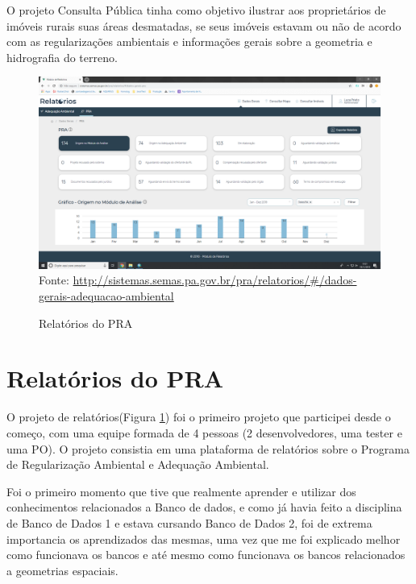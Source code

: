 O projeto Consulta Pública tinha como objetivo ilustrar aos proprietários de imóveis rurais suas áreas desmatadas, se seus imóveis estavam ou não de acordo com as regularizações ambientais e informações gerais sobre a geometria e hidrografia do terreno.

\begin{figure}[H]
\centering
\caption{Relatórios do PRA} %
\includegraphics[scale=0.22]{relatorios-pra}\\  %
{\small Fonte: \url{http://sistemas.semas.pa.gov.br/pra/relatorios/#/dados-gerais-adequacao-ambiental}} %
\label{fig:relatorios} %
\end{figure}

\section{Relatórios do PRA}
O projeto de relatórios(Figura \ref{fig:relatorios}) foi o primeiro projeto que participei desde o começo, com uma equipe formada de 4 pessoas (2 desenvolvedores, uma tester e uma PO).
O projeto consistia em uma plataforma de relatórios sobre o Programa de Regularização Ambiental e Adequação Ambiental.

Foi o primeiro momento que tive que realmente aprender e utilizar dos conhecimentos relacionados a Banco de dados, e como já havia feito a disciplina de Banco de Dados 1 e estava cursando Banco de Dados 2, foi de extrema importancia os aprendizados das mesmas,
uma vez que me foi explicado melhor como funcionava os bancos e até mesmo como funcionava os bancos relacionados a geometrias espaciais.

